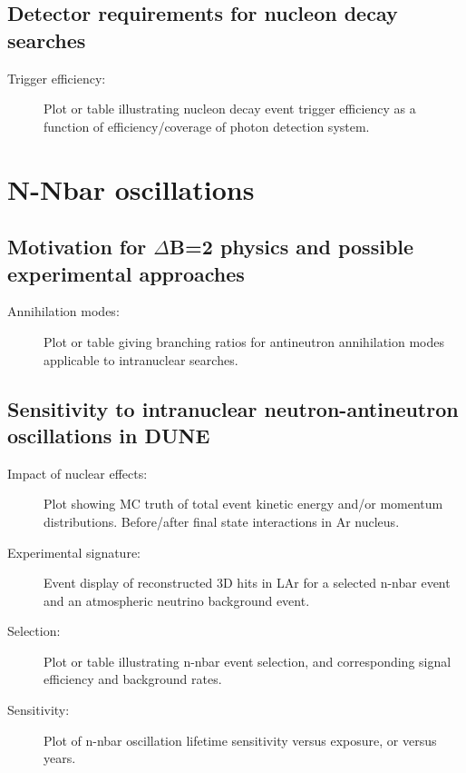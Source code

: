 \subsection{Detector requirements for nucleon decay searches}
\label{subsec:nonaccel-ndk-requirements}

\begin{description}
\item[Trigger efficiency:] Plot or table illustrating nucleon decay event trigger efficiency as a function of efficiency/coverage of photon detection system.
\end{description}


\section{N-Nbar oscillations}
\label{sec:nonaccel-nnbar}

\subsection{Motivation for $\Delta$B=2 physics and possible experimental approaches}
\label{subsec:nonaccel-nnbar-intro}

\begin{description}
\item[Annihilation modes:] Plot or table giving branching ratios for antineutron annihilation modes applicable to intranuclear searches.
\end{description}


\subsection{Sensitivity to intranuclear neutron-antineutron oscillations in DUNE}
\label{subsec:nonaccel-nnbar-dunesensitivity}

\begin{description}
\item[Impact of nuclear effects:] Plot showing MC truth of total event kinetic energy and/or momentum distributions. Before/after final state interactions in Ar nucleus.
\item[Experimental signature:] Event display of reconstructed 3D hits in LAr for a selected n-nbar event and an atmospheric neutrino background event.
\item[Selection:] Plot or table illustrating n-nbar event selection, and corresponding signal efficiency and background rates.
\item[Sensitivity:] Plot of n-nbar oscillation lifetime sensitivity versus exposure, or versus years.
\end{description}


